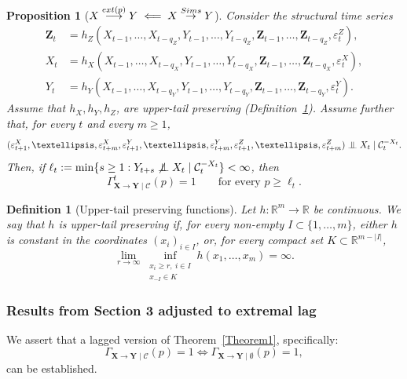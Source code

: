 \documentclass[a4paper,11pt]{article}
\newtheorem{proposition}{Proposition}
\newtheorem{definition}{Definition}
\newcommand{\indep}{\perp\kern-5.5pt\perp}
\newcommand{\toverset}[2]{\overset{{\rm #1}}{#2}}
\begin{document}
\begin{proposition}[$   \textbf{X}\overset{{\rm ext}(p)}{\longrightarrow}\textbf{Y}  \impliedby \textbf{X}\toverset{Sims}{\to}\textbf{Y}  $]\label{proposition_with_lag_2}
Consider the structural time series
\[
\begin{split}
   \mathbf Z_t
   &= h_Z(X_{t-1},\ldots,X_{t-q_Z},
          Y_{t-1},\ldots,Y_{t-q_Z},
          \mathbf Z_{t-1},\ldots,\mathbf Z_{t-q_Z},
          \varepsilon^Z_t),\\
   X_t
   &= h_X(X_{t-1},\ldots,X_{t-q_X},
          Y_{t-1},\ldots,Y_{t-q_X},
          \mathbf Z_{t-1},\ldots,\mathbf Z_{t-q_X},
          \varepsilon^X_t),\\
   Y_t
   &= h_Y(X_{t-1},\ldots,X_{t-q_Y},
          Y_{t-1},\ldots,Y_{t-q_Y},
          \mathbf Z_{t-1},\ldots,\mathbf Z_{t-q_Y},
          \varepsilon^Y_t).
\end{split}
\]
Assume that \(h_X,h_Y,h_Z\), are upper-tail preserving (Definition~\ref{upper_tail_preserving_definition}). Assume further that,
for every \(t\) and every \(m\ge 1\),
\[
   (\varepsilon^X_{t+1},\ldots,\varepsilon^X_{t+m},
    \varepsilon^Y_{t+1},\ldots,\varepsilon^Y_{t+m},
    \varepsilon^Z_{t+1},\ldots,\varepsilon^Z_{t+m})
   \indep X_t \mid \mathcal C_t^{-X_t}.
\]
Then, if $
   \ell_t:=\min\{s\ge 1:
   Y_{t+s}\not\indep X_t\mid \mathcal C_t^{-X_t}\}<\infty$, then
\[
   \Gamma_{\mathbf X\to \mathbf Y\mid\mathcal C}^t(p)=1
   \qquad\text{for every }p\ge \ell_t.
\]
\end{proposition}

\begin{definition}[Upper-tail preserving functions]\label{upper_tail_preserving_definition}
Let \(h:\mathbb R^m\to\mathbb R\) be continuous. We say that \(h\) is upper-tail preserving if, for every non-empty
\(I\subset\{1,\ldots,m\}\), either \(h\) is constant in the coordinates
\((x_i)_{i\in I}\), or, for every compact set
\(K\subset \mathbb R^{m-|I|}\),
\[
    \lim_{r\to\infty}
    \inf_{\substack{x_i\ge r,\ i\in I\\ x_{-I}\in K}}
    h(x_1,\ldots,x_m)=\infty .
\]
\end{definition}



\subsubsection{Results from Section 3 adjusted to extremal lag}
\label{supplement_section3_lagged}
We assert that a lagged version of Theorem~\ref{Theorem1}, specifically:
\begin{equation}\label{OhYeah_lagged}
\Gamma_{\textbf{X}\to\textbf{Y}\mid\mathcal{C}}(p) = 1 \iff  \Gamma_{\textbf{X}\to\textbf{Y}\mid \emptyset}(p) = 1,
\end{equation}
can be established. 
\end{document}
